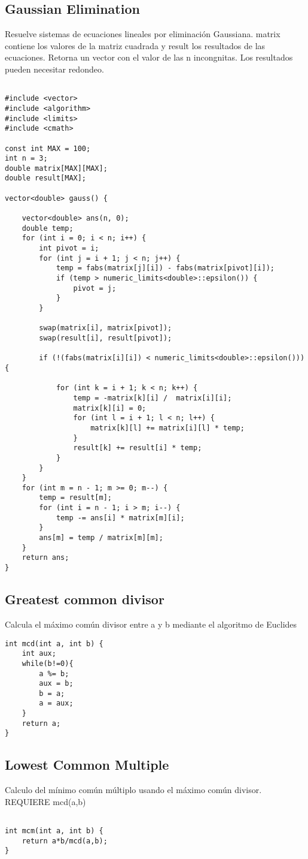 \documentclass[11pt,letterpaper,twocolumn,twosided]{article}
\begin{document}
\subsection{Gaussian Elimination}
Resuelve sistemas de ecuaciones lineales por eliminaci\'on Gaussiana.  matrix contiene los valores de la matriz cuadrada y result los resultados de las ecuaciones. Retorna un vector con el valor de las n incongnitas. Los resultados pueden necesitar redondeo.
\begin{lstlisting}

#include <vector>
#include <algorithm>
#include <limits>
#include <cmath>

const int MAX = 100;
int n = 3;
double matrix[MAX][MAX];
double result[MAX];

vector<double> gauss() {
	
  	vector<double> ans(n, 0);
  	double temp;
	for (int i = 0; i < n; i++) {
    	int pivot = i;
	    for (int j = i + 1; j < n; j++) {
	    	temp = fabs(matrix[j][i]) - fabs(matrix[pivot][i]);
	      	if (temp > numeric_limits<double>::epsilon()) {
	        	pivot = j;
	      	}
	    }
	    
	    swap(matrix[i], matrix[pivot]);
	    swap(result[i], result[pivot]);
	    
	    if (!(fabs(matrix[i][i]) < numeric_limits<double>::epsilon())) {
	    	
	    	for (int k = i + 1; k < n; k++) {
		      	temp = -matrix[k][i] /  matrix[i][i];
		      	matrix[k][i] = 0;
		      	for (int l = i + 1; l < n; l++) {
		        	matrix[k][l] += matrix[i][l] * temp;
		      	}
		      	result[k] += result[i] * temp;
		    }
	    }
  	}
  	for (int m = n - 1; m >= 0; m--) {
    	temp = result[m];
    	for (int i = n - 1; i > m; i--) {
    		temp -= ans[i] * matrix[m][i];
    	}
    	ans[m] = temp / matrix[m][m];
  	}
  	return ans;
}
\end{lstlisting}

\subsection{Greatest common divisor}
Calcula el m\'aximo com\'un divisor entre a y b mediante el algoritmo de Euclides
\begin{lstlisting}
int mcd(int a, int b) {
	int aux;
	while(b!=0){
		a %= b;
		aux = b;
		b = a;
		a = aux;
	}
	return a;
}
\end{lstlisting}

\subsection{Lowest Common Multiple}
Calculo del m\'inimo com\'un m\'ultiplo usando el m\'aximo com\'un divisor. REQUIERE mcd(a,b)
\begin{lstlisting}

int mcm(int a, int b) {
	return a*b/mcd(a,b);
}
\end{lstlisting}
\end{document}
